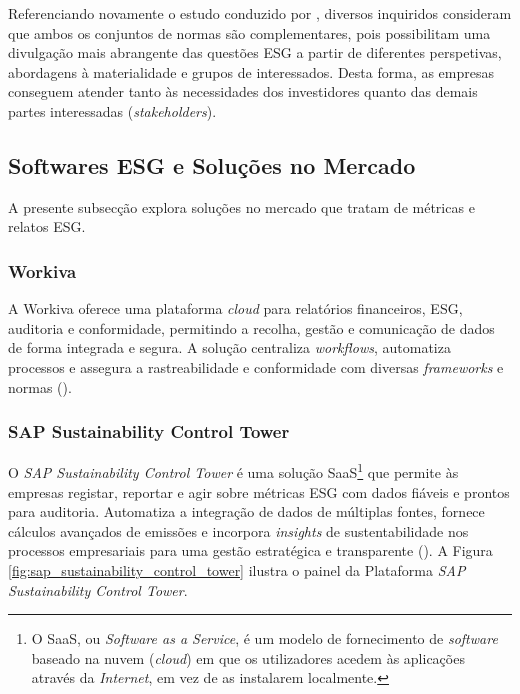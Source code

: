 Referenciando novamente o estudo conduzido por \cite{GRISASB2021}, diversos inquiridos consideram que ambos os conjuntos de normas são complementares, pois possibilitam uma divulgação mais abrangente das questões ESG a partir de diferentes perspetivas, abordagens à materialidade e grupos de interessados. Desta forma, as empresas conseguem atender tanto às necessidades dos investidores quanto das demais partes interessadas (\textit{stakeholders}).


\subsection{Softwares ESG e Soluções no Mercado}
\label{subsec: SESGSM}

A presente subsecção explora soluções no mercado que tratam de métricas e relatos ESG.

\subsubsection{Workiva}

A Workiva oferece uma plataforma \textit{cloud} para relatórios financeiros, ESG, auditoria e conformidade, permitindo a recolha, gestão e comunicação de dados de forma integrada e segura. A solução centraliza \textit{workflows}, automatiza processos e assegura a rastreabilidade e conformidade com diversas \textit{frameworks} e normas (\cite{Workiva2025}).

\subsubsection{SAP Sustainability Control Tower}

O \textit{SAP Sustainability Control Tower} é uma solução SaaS\footnote{O SaaS, ou \textit{Software as a Service}, é um modelo de fornecimento de \textit{software} baseado na nuvem (\textit{cloud}) em que os utilizadores acedem às aplicações através da \textit{Internet}, em vez de as instalarem  localmente.} que permite às empresas registar, reportar e agir sobre métricas ESG com dados fiáveis e prontos para auditoria. Automatiza a integração de dados de múltiplas fontes, fornece cálculos avançados de emissões e incorpora \textit{insights} de sustentabilidade nos processos empresariais para uma gestão estratégica e transparente (\cite{SAP2025}). A Figura \ref{fig:sap_sustainability_control_tower} ilustra o painel da Plataforma \textit{SAP Sustainability Control Tower}.

